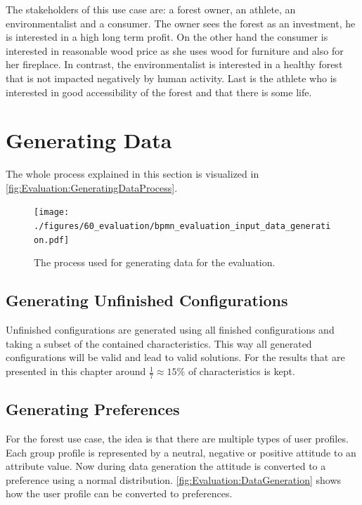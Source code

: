 The stakeholders of this use case are: a forest owner, an athlete, an environmentalist and a consumer. The owner sees the forest as an investment, he is interested in a high long term profit. On the other hand the consumer is interested in reasonable wood price as she uses wood for furniture and also for her fireplace. In contrast, the environmentalist is interested in a healthy forest that is not impacted negatively by human activity. Last is the athlete who is interested in good accessibility of the forest and that there is some life.  

\section{Generating Data}
\label{sec:Evaluation:GeneratingGroups}

The whole process explained in this section is visualized in \autoref{fig:Evaluation:GeneratingDataProcess}.

\begin{figure}
    \centering
    \texttt{[image: ./figures/60\_evaluation/bpmn\_evaluation\_input\_data\_generation.pdf]}
    \caption{The process used for generating data for the evaluation.}
    \label{fig:Evaluation:GeneratingDataProcess}
\end{figure}

\subsection{Generating Unfinished Configurations}

Unfinished configurations are generated using all finished configurations and taking a subset of the contained characteristics. This way all generated configurations will be valid and lead to valid solutions. For the results that are presented in this chapter around $\frac{1}{7} \approx 15\%$ of characteristics is kept.


\subsection{Generating Preferences}

For the forest use case, the idea is that there are multiple types of user profiles. Each group profile is represented by a neutral, negative or positive attitude to an attribute value. Now during data generation the attitude is converted to a preference using a normal distribution. \autoref{fig:Evaluation:DataGeneration} shows how the user profile can be converted to preferences.

